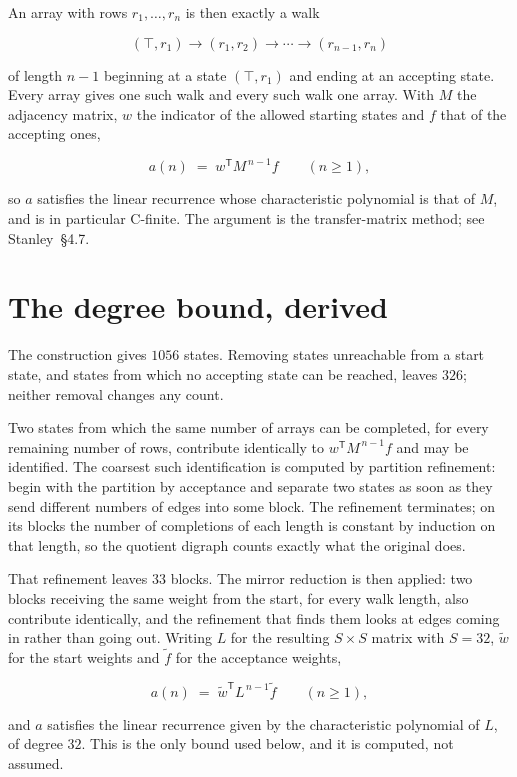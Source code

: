 \documentclass[11pt]{article}
\theoremstyle{definition}
\begin{document}
An array with rows $r_1,\dots,r_n$ is then exactly a walk

\[(\top,r_1) \to (r_1,r_2) \to \cdots \to (r_{n-1},r_n)\]

of length $n-1$ beginning at a state $(\top,r_1)$ and ending at an accepting state. Every array gives one such walk and every such walk one array. With $M$ the adjacency matrix, $w$ the indicator of the allowed starting states and $f$ that of the accepting ones,

\[a(n) \;=\; w^{\mathsf T} M^{\,n-1} f \qquad (n \ge 1),\]

so $a$ satisfies the linear recurrence whose characteristic polynomial is that of $M$, and is in particular C-finite. The argument is the transfer-matrix method; see Stanley~\S4.7.

\section{The degree bound, derived}

The construction gives $1056$ states. Removing states unreachable from a start state, and states from which no accepting state can be reached, leaves $326$; neither removal changes any count.

Two states from which the same number of arrays can be completed, for every remaining number of rows, contribute identically to $w^{\mathsf T}M^{\,n-1}f$ and may be identified. The coarsest such identification is computed by partition refinement: begin with the partition by acceptance and separate two states as soon as they send different numbers of edges into some block. The refinement terminates; on its blocks the number of completions of each length is constant by induction on that length, so the quotient digraph counts exactly what the original does.

That refinement leaves $33$ blocks. The mirror reduction is then applied: two blocks receiving the same weight from the start, for every walk length, also contribute identically, and the refinement that finds them looks at edges coming in rather than going out. Writing $L$ for the resulting $S \times S$ matrix with $S = 32$, $\tilde w$ for the start weights and $\tilde f$ for the acceptance weights,

\[a(n) \;=\; \tilde w^{\mathsf T} L^{\,n-1} \tilde f \qquad (n \ge 1),\]

and $a$ satisfies the linear recurrence given by the characteristic polynomial of $L$, of degree $32$. This is the only bound used below, and it is computed, not assumed.
\end{document}
